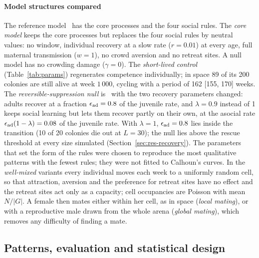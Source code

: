 \paragraph{Model structures compared}
The reference model \Cone\ has the core processes and the four social rules. The \emph{core model} keeps the core
processes but replaces the four social rules by neutral values: no window, individual recovery at a slow rate ($r=0.01$) at every age,
full maternal transmission ($w=1$), no crowd aversion and no retreat sites. A null model has no crowding damage
($\gamma=0$). The \emph{short-lived control} (Table~\ref{tab:params}) regenerates competence individually; in space 89
of its 200 colonies are still alive at week $1\,000$, cycling with a period of 162 [155, 170] weeks. The
\emph{reversible-suppression null} is \Cone\ with the two recovery parameters changed: adults recover at a fraction
$\epsilon_{\rm ad}=0.8$ of the juvenile rate, and $\lambda=0.9$ instead of 1 keeps social learning but lets them recover partly
on their own, at the asocial rate $\epsilon_{\rm ad}(1-\lambda)=0.08$ of the juvenile rate. With $\lambda=1$, $\epsilon_{\rm ad}=0.8$
lies inside the transition (10 of 20 colonies die out at $L=30$); the null lies above the rescue threshold at every
size simulated (Section~\ref{sec:res-recovery}). The parameters that set the form of the rules were chosen to reproduce the most
qualitative patterns with the fewest rules; they were not fitted to Calhoun's curves. In the \emph{well-mixed}
variants every individual moves each week to a uniformly random cell, so that attraction, aversion and the
preference for retreat sites have no effect and the retreat sites act only as a capacity; cell occupancies are
Poisson with mean $N/|G|$. A female then mates either within her cell, as in space (\emph{local mating}), or with a
reproductive male drawn from the whole arena (\emph{global mating}), which removes any difficulty of finding a mate.

\subsection{Patterns, evaluation and statistical design}
\label{sec:patterns}

